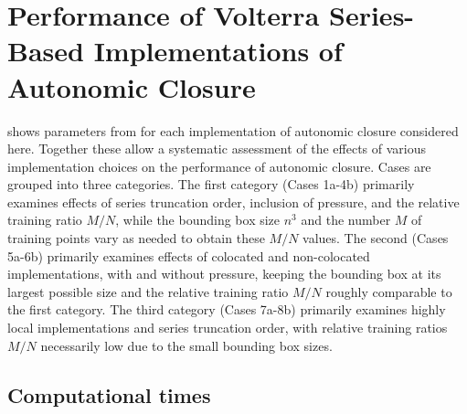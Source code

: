 \graphicspath{ {./Ch5/}  } 

%




%

\chapter{Performance of Volterra Series-Based Implementations of Autonomic Closure}
\label{ch:5}

 shows parameters from  for each implementation of autonomic closure considered here. Together these allow a systematic assessment of the effects of various implementation choices on the performance of autonomic closure. Cases are grouped into three categories. The first category (Cases 1a-4b) primarily examines effects of series truncation order, inclusion of pressure, and the relative training ratio $M/N$, while the bounding box size $n^3$ and the number $M$ of training points vary as needed to obtain these  $M/N$ values. The second (Cases 5a-6b) primarily examines effects of colocated and non-colocated implementations, with and without pressure, keeping the bounding box at its largest possible size and the relative training ratio  $M/N$ roughly comparable to the first category. The third category (Cases 7a-8b) primarily examines highly local implementations and series truncation order, with relative training ratios $M/N$  necessarily low due to the small bounding box sizes. 

\section{Computational times} 
\label{sec:IVA}


